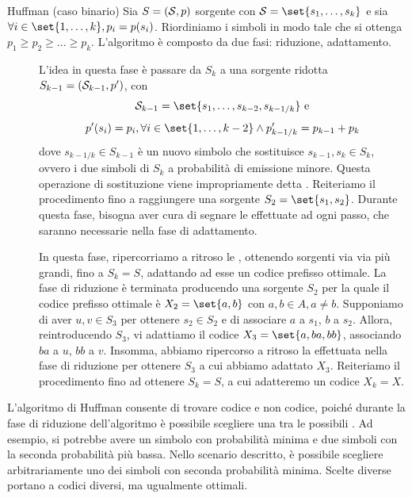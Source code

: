 \begin{algorithmdesc}{Huffman (caso binario)}
  Sia \(S = (\mathcal{S},p)\) sorgente con \(\SCal = \set{s_1, \ldots, s_k}\) e sia \(\forall i \in \set{1,\ldots,k}, p_i=p(s_i)\). Riordiniamo i simboli in modo tale che si ottenga \(p_1 \geq p_2 \geq \ldots \geq p_k\).
  L'algoritmo è composto da due fasi: riduzione, adattamento.
  \begin{description}
    \item[] 
      L'idea in questa fase è passare da $S_k$ a una sorgente ridotta \(S_{k-1} =(\mathcal{S}_{k-1}, p')\), con
      \[\SCal_{k-1} = \set{s_1,\ldots,s_{k-2}, s_{k-1/k}} \text{ e}\]
      \[p'(s_i)=p_i, \forall i \in \set{1,\ldots,k-2} \land p_{k-1/k}' = p_{k-1} + p_k\] 
      dove \(s_{k-1/k}\in S_{k-1}\) è un nuovo simbolo che sostituisce \(s_{k-1},s_k\in S_{k}\), ovvero i due simboli di $S_k$ a probabilità di emissione minore. Questa operazione di sostituzione viene impropriamente detta .
      Reiteriamo il procedimento fino a raggiungere una sorgente $S_2=\set{s_1, s_2}$.  Durante questa fase, bisogna aver cura di segnare le  effettuate ad ogni passo, che saranno necessarie nella fase di adattamento.
    \item[]
      In questa fase, ripercorriamo a ritroso le , ottenendo sorgenti via via più grandi, fino a $S_{k}=S$, adattando ad esse un codice prefisso ottimale. 
      La fase di riduzione è terminata producendo una sorgente $S_2$ per la quale il codice prefisso ottimale è \(X_2 = \set{a,b}\) con \(a,b \in A, a \neq b\).
      Supponiamo di aver  $u,v \in S_{3}$ per ottenere $s_2 \in S_{2}$ e di associare $a$ a $s_1$, $b$ a $s_2$. Allora, reintroducendo $S_{3}$, vi adattiamo il codice $X_{3}=\set{a,ba,bb}$, associando $ba$ a $u$, $bb$ a $v$. Insomma, abbiamo ripercorso a ritroso la  effettuata nella fase di riduzione per ottenere $S_{3}$ a cui abbiamo adattato $X_{3}$. Reiteriamo il procedimento fino ad ottenere $S_{k}=S$, a cui adatteremo un codice $X_{k}=X$.
  \end{description}
\end{algorithmdesc}

\begin{note}{}
  L'algoritmo di Huffman consente di trovare  codice e non  codice, poiché durante la fase di riduzione dell'algoritmo è possibile scegliere una tra le possibili . Ad esempio, si potrebbe avere un simbolo con probabilità minima e due simboli con la seconda probabilità più bassa. Nello scenario descritto, è possibile scegliere arbitrariamente uno dei simboli con seconda probabilità minima. Scelte diverse portano a codici diversi, ma ugualmente ottimali.
\end{note}

